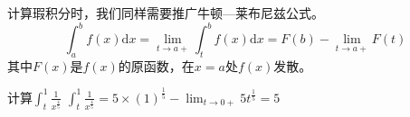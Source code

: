 
计算瑕积分时，我们同样需要推广牛顿—莱布尼兹公式。
\begin{equation}
\displaystyle \int ^{b}_a f(x)\mathrm{d} x=\lim_{t\rightarrow a+}\int _t^{b}f(x)\mathrm{d} x
= F(b) - \lim_{t\rightarrow a+ }F(t)
\end{equation}
其中$F(x)$是$f(x)$的原函数，在$x=a$处$f(x)$发散。

\begin{example}{计算$\int_t^1 \frac{1}{x^{\frac{4}{5}}}$}
$\int_t^1 \frac{1}{x^{\frac{4}{5}}} = 5\times(1)^{\frac{1}{5}} - \lim_{t\rightarrow 0+ }5t^{\frac{1}{5}}=5$
\end{example}
